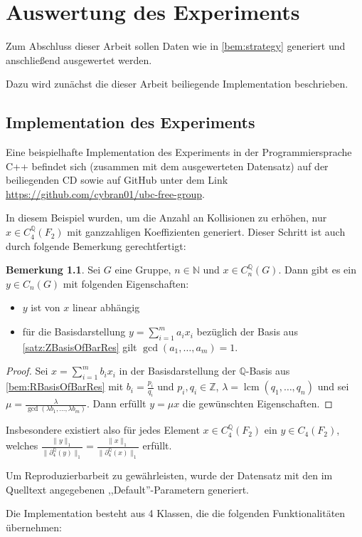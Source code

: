 \documentclass[a4paper,twoside,10pt]{scrreprt}
\DeclareMathOperator{\lcm}{lcm}
\newcommand{\Z}{\mathbb{Z}}
\newcommand{\N}{\mathbb{N}}
\newcommand{\Q}{\mathbb{Q}}
\theoremstyle{definition}
\newtheorem{bemerkung}[satz]{Bemerkung}
\begin{document}
\chapter{Auswertung des Experiments}
Zum Abschluss dieser Arbeit sollen Daten wie in \cref{bem:strategy} generiert und anschließend ausgewertet werden.\par
Dazu wird zunächst die dieser Arbeit beiliegende Implementation beschrieben.

\section{Implementation des Experiments}
Eine beispielhafte Implementation des Experiments in der Programmiersprache C++ befindet sich (zusammen mit dem ausgewerteten Datensatz) auf der beiliegenden CD sowie auf GitHub unter dem Link \url{https://github.com/cybran01/ubc-free-group}.
\par
In diesem Beispiel wurden, um die Anzahl an Kollisionen zu erhöhen, nur $x\in C_4^{\Q}(F_2)$ mit ganzzahligen Koeffizienten generiert.
Dieser Schritt ist auch durch folgende Bemerkung gerechtfertigt:
\begin{bemerkung}\label{bem:ZUBC}
Sei $G$ eine Gruppe, $n\in\N$ und $x\in C_n^{\Q}(G)$.
Dann gibt es ein $y\in C_n(G)$ mit folgenden Eigenschaften:
\begin{itemize}
\item $y$ ist von $x$ linear abhängig
\item für die Basisdarstellung $y=\sum\limits_{i=1}^ma_ix_i$ bezüglich der Basis aus \cref{satz:ZBasisOfBarRes} gilt $\gcd(a_1,\ldots,a_m)=1$.
\end{itemize} 
\begin{proof}
Sei $x=\sum\limits_{i=1}^mb_ix_i$ in der Basisdarstellung der $\Q$-Basis aus \cref{bem:RBasisOfBarRes} mit $b_i=\frac{p_i}{q_i}$ und $p_i,q_i\in\Z$, $\lambda=\lcm(q_1,\ldots,q_n)$ und sei $\mu=\frac{\lambda}{\gcd(\lambda b_1,\ldots,\lambda b_m)}$. Dann erfüllt $y=\mu x$ die gewünschten Eigenschaften.
\end{proof}
\end{bemerkung} 
Insbesondere existiert also für jedes Element $x\in C_4^{\Q}(F_2)$ ein $y\in C_4(F_2)$, welches $\frac{\|y\|_1}{\|\partial_4^{\Q}(y)\|_1}=\frac{\|x\|_1}{\|\partial_4^{\Q}(x)\|_1}$ erfüllt.\par 
Um Reproduzierbarbeit zu gewährleisten, wurde der Datensatz mit den im Quelltext angegebenen ,,Default''-Parametern generiert.
\par
Die Implementation besteht aus 4 Klassen, die die folgenden Funktionalitäten übernehmen:
\end{document}
